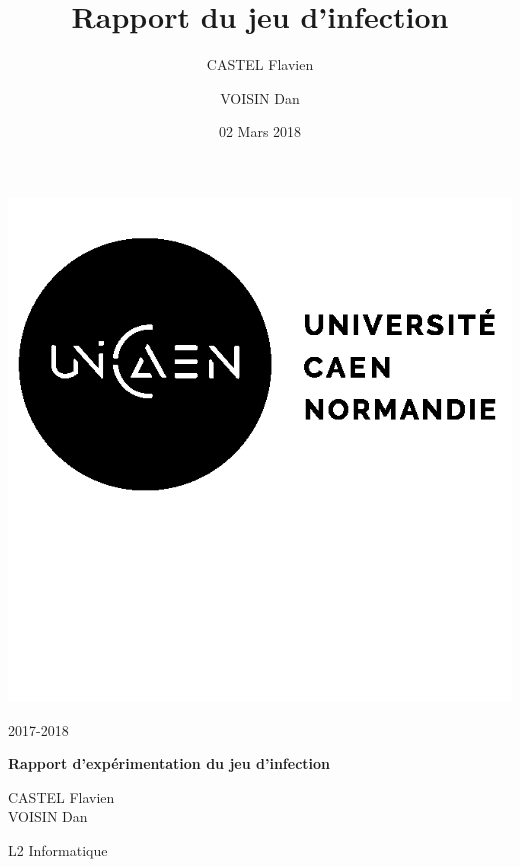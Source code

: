 \documentclass[12pt, a4paper]{article}
\title{Rapport du jeu d'infection}
\author{CASTEL Flavien \and VOISIN Dan}
\date{02 Mars 2018}
\begin{document}
    
    \begin{titlepage}
        \begin{minipage}{0.4\linewidth}
            \includegraphics{img/logo.png}
        \end{minipage}
        \hfill
        \begin{minipage}{0.4\linewidth}
            \begin{flushright}
                2017-2018
            \end{flushright}
        \end{minipage}
        
        \vspace{7cm}
        
        \begin{center}
            \textbf{\Huge{Rapport d'expérimentation du jeu d'infection}}
        \end{center}
        
        \vspace{9cm}
        
        \begin{minipage}{0.4\linewidth}
            CASTEL Flavien\\
            VOISIN Dan
        \end{minipage}
        \hfill
        \begin{minipage}{0.4\linewidth}
            \begin{flushright}
                L2 Informatique
            \end{flushright}
        \end{minipage}
        
    \end{titlepage}
    
\end{document}
